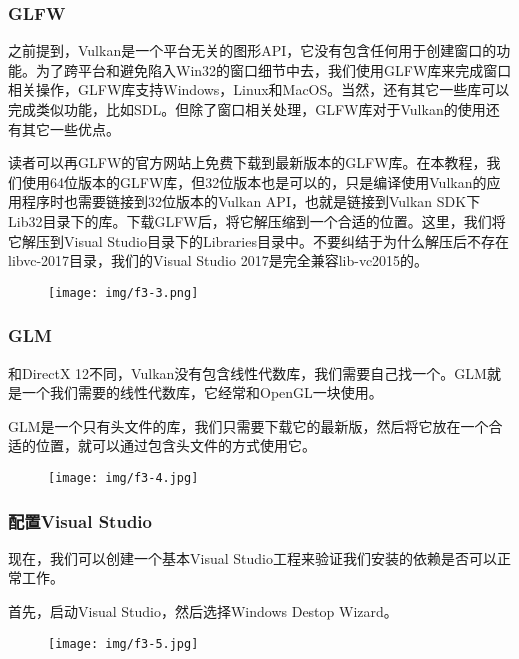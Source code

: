 \documentclass{ctexart}
\begin{document}
\subsubsection{GLFW}

之前提到，Vulkan是一个平台无关的图形API，它没有包含任何用于创建窗口的功能。为了跨平台和避免陷入Win32的窗口细节中去，我们使用GLFW库来完成窗口相关操作，GLFW库支持Windows，Linux和MacOS。当然，还有其它一些库可以完成类似功能，比如SDL。但除了窗口相关处理，GLFW库对于Vulkan的使用还有其它一些优点。

读者可以再GLFW的官方网站上免费下载到最新版本的GLFW库。在本教程，我们使用64位版本的GLFW库，但32位版本也是可以的，只是编译使用Vulkan的应用程序时也需要链接到32位版本的Vulkan API，也就是链接到Vulkan SDK下Lib32目录下的库。下载GLFW后，将它解压缩到一个合适的位置。这里，我们将它解压到Visual Studio目录下的Libraries目录中。不要纠结于为什么解压后不存在libvc-2017目录，我们的Visual Studio 2017是完全兼容lib-vc2015的。

\begin{figure}[H]
	\centering
	\texttt{[image: img/f3-3.png]}
\end{figure}

\subsubsection{GLM}

和DirectX 12不同，Vulkan没有包含线性代数库，我们需要自己找一个。GLM就是一个我们需要的线性代数库，它经常和OpenGL一块使用。

GLM是一个只有头文件的库，我们只需要下载它的最新版，然后将它放在一个合适的位置，就可以通过包含头文件的方式使用它。

\begin{figure}[H]
	\centering
	\texttt{[image: img/f3-4.jpg]}
\end{figure}

\subsubsection{配置Visual Studio}

现在，我们可以创建一个基本Visual Studio工程来验证我们安装的依赖是否可以正常工作。

首先，启动Visual Studio，然后选择Windows Destop Wizard。

\begin{figure}[H]
	\centering
	\texttt{[image: img/f3-5.jpg]}
\end{figure}
\end{document}
